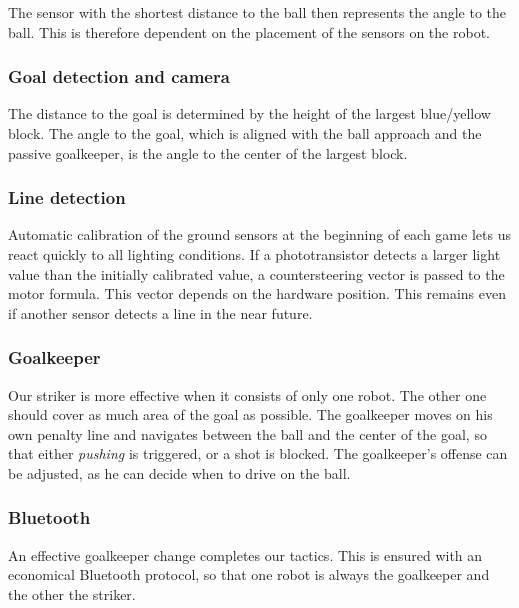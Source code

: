 The sensor with the shortest distance to the ball then represents the angle to the ball. This is therefore dependent on the placement of the sensors on the robot.

\subsubsection{Goal detection and camera}
The distance to the goal is determined by the height of the largest blue/yellow block.
The angle to the goal, which is aligned with the ball approach and the passive goalkeeper, is the angle to the center of the largest block. 

\subsubsection{Line detection}
Automatic calibration of the ground sensors at the beginning of each game lets us react quickly to all lighting conditions. 
If a phototransistor detects a larger light value than the initially calibrated value, a countersteering vector is passed to the motor formula. 
This vector depends on the hardware position. This remains even if another sensor detects a line in the near future.

\subsubsection{Goalkeeper}
Our striker is more effective when it consists of only one robot. The other one should cover as much area of the goal as possible.
The goalkeeper moves on his own penalty line and navigates between the ball and the center of the goal, so that either \textit{pushing} is triggered, or a shot is blocked.
The goalkeeper's offense can be adjusted, as he can decide when to drive on the ball. 

\subsubsection{Bluetooth}
An effective goalkeeper change completes our tactics. This is ensured with an economical Bluetooth protocol, so that one robot is always the goalkeeper and the other the striker. 